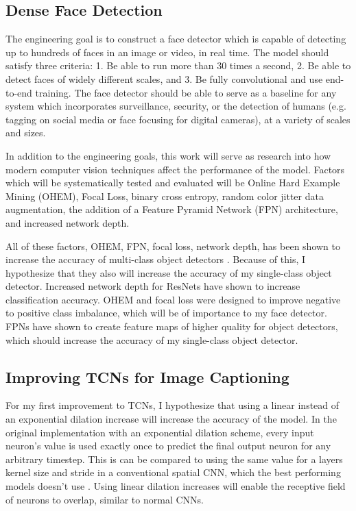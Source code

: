 \documentclass[a4paper, twoside]{article}
\begin{document}
\subsection{Dense Face Detection}
The engineering goal is to construct a face detector which is capable of detecting up to hundreds of faces in an image or video, in real time. The model should satisfy three criteria: 1. Be able to run more than 30 times a second, 2. Be able to detect faces of widely different scales, and 3. Be fully convolutional and use end-to-end training. The face detector should be able to serve as a baseline for any system which incorporates surveillance, security, or the detection of humans (e.g. tagging on social media or face focusing for digital cameras), at a variety of scales and sizes.

In addition to the engineering goals, this work will serve as research into how modern computer vision techniques affect the performance of the model. Factors which will be systematically tested and evaluated will be Online Hard Example Mining (OHEM), Focal Loss, binary cross entropy, random color jitter data augmentation, the addition of a Feature Pyramid Network (FPN) architecture, and increased network depth.

All of these factors, OHEM, FPN, focal loss, network depth, has been shown to increase the accuracy of multi-class object detectors \cite{ohem} \cite{fpn} \cite{retinanet} \cite{resnet}. Because of this, I hypothesize that they also will increase the accuracy of my single-class object detector. Increased network depth for ResNets have shown to increase classification accuracy. OHEM and focal loss were designed to improve negative to positive class imbalance, which will be of importance to my face detector. FPNs have shown to create feature maps of higher quality for object detectors, which should increase the accuracy of my single-class object detector.

\subsection{Improving TCNs for Image Captioning}
For my first improvement to TCNs, I hypothesize that using a linear instead of an exponential dilation increase will increase the accuracy of the model. In the original implementation \cite{tcn} with an exponential dilation scheme, every input neuron's value is used exactly once to predict the final output neuron for any arbitrary timestep. This is can be compared to using the same value for a layers kernel size and stride in a conventional spatial CNN, which the best performing models doesn't use \cite{cs231n} \cite{resnet}. Using linear dilation increases will enable the receptive field of neurons to overlap, similar to normal CNNs. 
\end{document}
